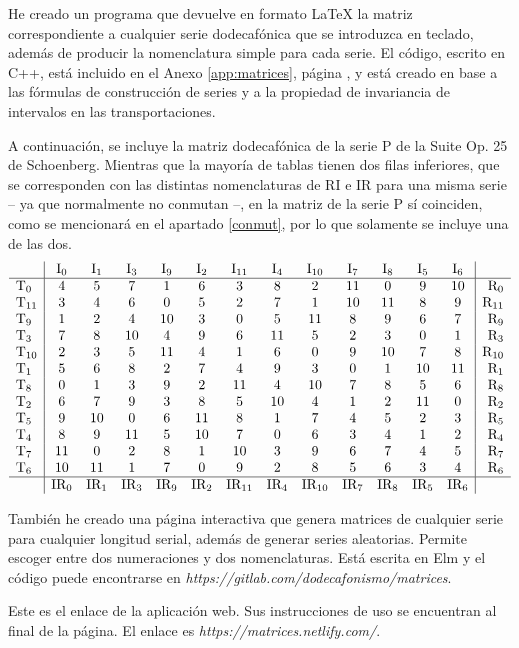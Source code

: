 		He creado un programa que devuelve en formato \LaTeX{} la matriz correspondiente a cualquier serie dodecafónica que se introduzca en teclado, además de producir la nomenclatura simple para cada serie. El código, escrito en C++, está incluido en el Anexo \ref{app:matrices}, página \pageref{app:matrices}, y está creado en base a las fórmulas de construcción de series y a la propiedad de invariancia de intervalos en las transportaciones.
		
		A continuación, se incluye la matriz dodecafónica de la serie P de la Suite Op. 25 de Schoenberg. Mientras que la mayoría de tablas tienen dos filas inferiores, que se corresponden con las distintas nomenclaturas de RI e IR para una misma serie – ya que normalmente no conmutan –, en la matriz de la serie P sí coinciden, como se mencionará en el apartado \ref{conmut}, por lo que solamente se incluye una de las dos.		
		$$\begin{array}{l|cccccccccccc|r}
		&\text{I}_{0}&\text{I}_{1}&\text{I}_{3}&\text{I}_{9}&\text{I}_{2}&\text{I}_{11}&\text{I}_{4}&\text{I}_{10}&\text{I}_{7}&\text{I}_{8}&\text{I}_{5}&\text{I}_{6}&\\
		\hline
		\text{T}_{0}&4&5&7&1&6&3&8&2&11&0&9&10&\text{R}_{0}\\
		\text{T}_{11}&3&4&6&0&5&2&7&1&10&11&8&9&\text{R}_{11}\\
		\text{T}_{9}&1&2&4&10&3&0&5&11&8&9&6&7&\text{R}_{9}\\
		\text{T}_{3}&7&8&10&4&9&6&11&5&2&3&0&1&\text{R}_{3}\\
		\text{T}_{10}&2&3&5&11&4&1&6&0&9&10&7&8&\text{R}_{10}\\
		\text{T}_{1}&5&6&8&2&7&4&9&3&0&1&10&11&\text{R}_{1}\\
		\text{T}_{8}&0&1&3&9&2&11&4&10&7&8&5&6&\text{R}_{8}\\
		\text{T}_{2}&6&7&9&3&8&5&10&4&1&2&11&0&\text{R}_{2}\\
		\text{T}_{5}&9&10&0&6&11&8&1&7&4&5&2&3&\text{R}_{5}\\
		\text{T}_{4}&8&9&11&5&10&7&0&6&3&4&1&2&\text{R}_{4}\\
		\text{T}_{7}&11&0&2&8&1&10&3&9&6&7&4&5&\text{R}_{7}\\
		\text{T}_{6}&10&11&1&7&0&9&2&8&5&6&3&4&\text{R}_{6}\\
		\hline
		&\text{IR}_{0}&\text{IR}_{1}&\text{IR}_{3}&\text{IR}_{9}&\text{IR}_{2}&\text{IR}_{11}&\text{IR}_{4}&\text{IR}_{10}&\text{IR}_{7}&\text{IR}_{8}&\text{IR}_{5}&\text{IR}_{6}&
		\end{array}$$
		
		También he creado una página interactiva que genera matrices de cualquier serie para cualquier longitud serial, además de generar series aleatorias. Permite escoger entre dos numeraciones y dos nomenclaturas. Está escrita en Elm y el código puede encontrarse en \textit{https://gitlab.com/dodecafonismo/matrices}.
		
		\begin{wrapfigure}{l}{0.2\textwidth}
			\vspace{-0.5cm}
		\end{wrapfigure} Este es el enlace de la aplicación web. Sus instrucciones de uso se encuentran al final de la página. El enlace es \textit{https://matrices.netlify.com/}.
		